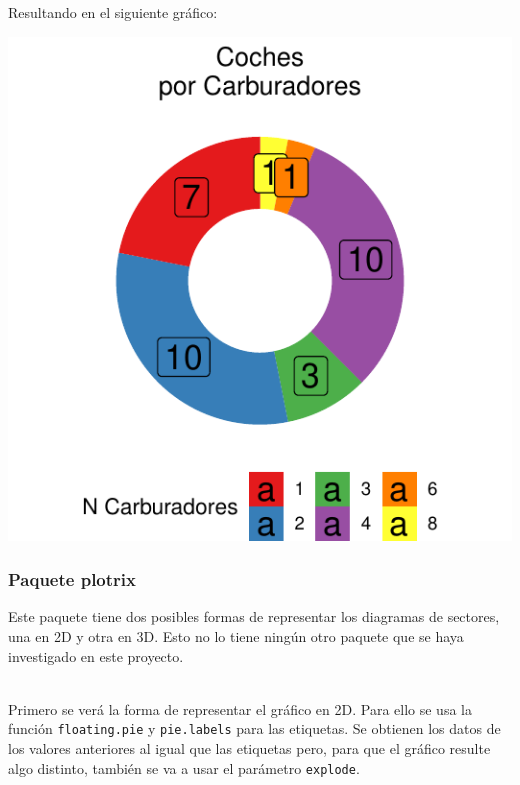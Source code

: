 \documentclass{article}\usepackage[]{graphicx}\usepackage[]{color}
\makeatletter
\def\maxwidth{ %
  \ifdim\Gin@nat@width>\linewidth
    \linewidth
  \else
    \Gin@nat@width
  \fi
}
\newenvironment{knitrout}{}{} %
\makeatother
\begin{document}
Resultando en el siguiente gr\'afico:
\begin{knitrout}
\color{fgcolor}

{\centering \includegraphics[width=\maxwidth]{figure/plot_donnut_ggplot-1} 

}



\end{knitrout}
\subsubsection{Paquete plotrix}
Este paquete\cite{docu_plotrix} tiene dos posibles formas de representar los diagramas de sectores, una en 2D y otra en 3D. Esto no lo tiene ning\'un otro paquete que se haya investigado en este proyecto.~\\~\par
Primero se ver\'a la forma de representar el gr\'afico en 2D. Para ello se usa la funci\'on \texttt{floating.pie} y \texttt{pie.labels} para las etiquetas. Se obtienen los datos de los valores anteriores al igual que las etiquetas pero, para que el gr\'afico resulte algo distinto, tambi\'en se va a usar el par\'ametro \texttt{explode}.
\end{document}
